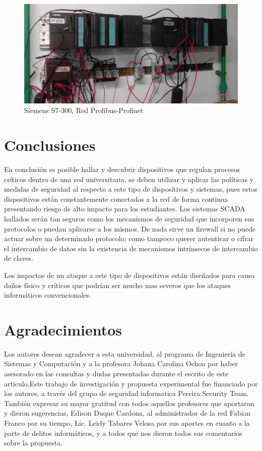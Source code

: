 \documentclass[jou]{apa6}   %
\begin{document}
\begin{figure}[htb]
\centering
\includegraphics[scale=0.2]{images/s73002.jpg}
\caption{Siemens S7-300, Red Profibus-Profinet} \label{fig:s73002}
\end{figure}
\newpage
\section{Conclusiones }
En conclusión es posible hallar y descubrir dispositivos que regulan procesos críticos dentro de una red universitaria, se deben utilizar y aplicar las políticas y medidas de seguridad al respecto a este tipo de dispositivos y sistemas, pues estos dispositivos están constantemente conectados a la red de forma continua presentando riesgo de alto impacto para los estudiantes. Los sistemas SCADA hallados serán tan seguros como los  mecanismos de seguridad que incorporen sus protocolos o puedan aplicarse a los mismos. De nada sirve un firewall si no puede actuar sobre un determinado protocolo; como tampoco querer autenticar o cifrar el intercambio de datos sin la existencia de mecanismos intrínsecos de intercambio de claves.

Los impactos de un ataque a este tipo de dispositivos están diseñados para causa daños físico y críticos que podrían ser mucho mas severos que los ataques informáticos convencionales.


\section{Agradecimientos }
Los autores desean agradecer a esta universidad, al programa de Ingeniería de Sistemas y Computación y a la profesora Johana Carolina Ochoa por haber asesorado en las consultas y dudas presentadas durante el escrito de este articulo.Este trabajo de investigación y propuesta experimental fue financiado por los autores, a través del grupo de seguridad informatica Pereira Security Team. También expresar su mayor gratitud con todos aquellos profesores que aportaron y dieron sugerencias, Edison Duque Cardona, al administrador de la red Fabian Franco por su tiempo, Lic. Leidy Tabares Velosa por sus aportes en cuanto a la parte de delitos informáticos, y a todos que nos dieron todos sus comentarios sobre la propuesta. 
\newpage
 
\end{document}

